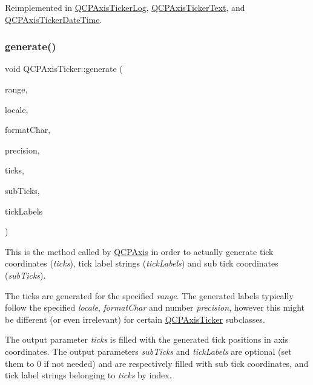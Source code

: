 Reimplemented in \hyperlink{class_q_c_p_axis_ticker_log_af8873a8d1d2b9392d8f7a73218c889ab}{Q\+C\+P\+Axis\+Ticker\+Log}, \hyperlink{class_q_c_p_axis_ticker_text_aa195c4fd0364d0393f1798fb495d6a60}{Q\+C\+P\+Axis\+Ticker\+Text}, and \hyperlink{class_q_c_p_axis_ticker_date_time_a44c2c09a303d281801b69226e243047d}{Q\+C\+P\+Axis\+Ticker\+Date\+Time}.

\mbox{\label{class_q_c_p_axis_ticker_aefbd11725678ca824add8cf926cbc856}} 
\subsubsection{\texorpdfstring{generate()}{generate()}}
{\footnotesize\ttfamily void Q\+C\+P\+Axis\+Ticker\+::generate (\begin{DoxyParamCaption}\item[{const \hyperlink{class_q_c_p_range}{Q\+C\+P\+Range} \&}]{range,  }\item[{const Q\+Locale \&}]{locale,  }\item[{Q\+Char}]{format\+Char,  }\item[{int}]{precision,  }\item[{Q\+Vector$<$ double $>$ \&}]{ticks,  }\item[{Q\+Vector$<$ double $>$ $\ast$}]{sub\+Ticks,  }\item[{Q\+Vector$<$ Q\+String $>$ $\ast$}]{tick\+Labels }\end{DoxyParamCaption})\hspace{0.3cm}{\ttfamily [virtual]}}

This is the method called by \hyperlink{class_q_c_p_axis}{Q\+C\+P\+Axis} in order to actually generate tick coordinates ({\itshape ticks}), tick label strings ({\itshape tick\+Labels}) and sub tick coordinates ({\itshape sub\+Ticks}).

The ticks are generated for the specified {\itshape range}. The generated labels typically follow the specified {\itshape locale}, {\itshape format\+Char} and number {\itshape precision}, however this might be different (or even irrelevant) for certain \hyperlink{class_q_c_p_axis_ticker}{Q\+C\+P\+Axis\+Ticker} subclasses.

The output parameter {\itshape ticks} is filled with the generated tick positions in axis coordinates. The output parameters {\itshape sub\+Ticks} and {\itshape tick\+Labels} are optional (set them to 0 if not needed) and are respectively filled with sub tick coordinates, and tick label strings belonging to {\itshape ticks} by index. \mbox{\label{class_q_c_p_axis_ticker_a2f1e223bafbf2cec7c3ba8b08d5c77e8}} 
